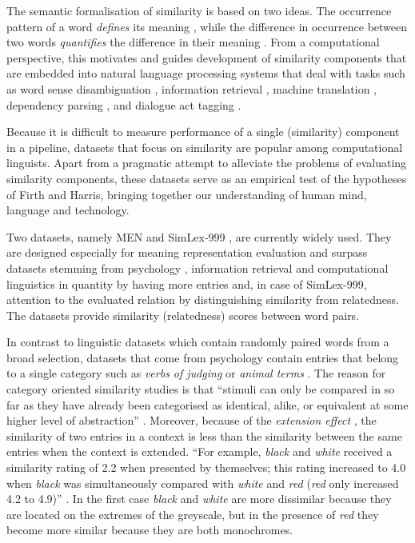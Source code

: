 \documentclass[11pt]{article}
\begin{document}
The semantic formalisation of similarity is based on two ideas. The occurrence pattern of a word \emph{defines} its meaning \cite{firth1957lingtheory}, while the difference in occurrence between two words \emph{quantifies} the difference in their meaning \cite{harris1954distributional}. From a computational perspective, this motivates and guides development of similarity components that are embedded into natural language processing systems that deal with tasks such as
word sense disambiguation \cite{Schutze:1998:AWS:972719.972724},
information retrieval \cite{Salton:1975:VSM:361219.361220,Milajevs:2015:IMN:2808194.2809448},
machine translation \cite{Dagan:1993:CWS:981574.981596},
dependency parsing \cite{hermann-blunsom:2013:ACL2013,andreas-klein:2014:P14-2},
and dialogue act tagging \cite{kalchbrenner-blunsom:2013:CVSC,milajevs-purver:2014:CVSC}.


Because it is difficult to measure performance of a single (similarity) component in a pipeline, datasets that focus on similarity are popular among computational linguists. Apart from a pragmatic attempt to alleviate the problems of evaluating similarity components, these datasets serve as an empirical test of the hypotheses of Firth and Harris, bringing together our understanding of human mind, language and technology.

Two datasets, namely MEN \cite{Bruni:2012:DST:2390524.2390544} and SimLex-999 \cite{hill2014simlex}, are currently widely used. They are designed especially for meaning representation evaluation and surpass datasets stemming from psychology \cite{1986-13502-00119860101}, information retrieval \cite{2002:PSC:503104.503110} and computational linguistics \cite{Rubenstein:1965:CCS:365628.365657} in quantity by having more entries and, in case of SimLex-999, attention to the evaluated relation by distinguishing similarity from relatedness. The datasets provide similarity (relatedness) scores between word pairs.

In contrast to linguistic datasets which contain randomly paired words from a broad selection, datasets that come from psychology contain entries that belong to a single category such as \textit{verbs of judging} \cite{FILLENBAUM197454} or \textit{animal terms} \cite{HENLEY1969176}. The reason for category oriented similarity studies is that ``stimuli can only be compared in so far as they have already been categorised as identical, alike, or equivalent at some higher level of abstraction'' \cite{turner1987rediscovering}. Moreover, because of the \emph{extension effect} \cite{medin1993respects}, the similarity of two entries in a context is less than the similarity between the same entries when the context is extended. ``For example, \textit{black} and \textit{white} received a similarity rating of 2.2 when presented by themselves; this rating increased to 4.0 when \textit{black} was simultaneously compared with \textit{white} and \textit{red} (\textit{red} only increased 4.2 to 4.9)'' \cite{medin1993respects}. In the first case \textit{black} and \textit{white} are more dissimilar because they are located on the extremes of the greyscale, but in the presence of \textit{red} they become more similar because they are both monochromes.
\end{document}
